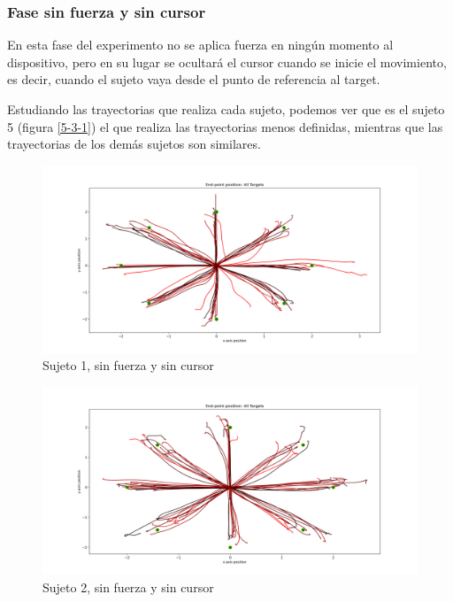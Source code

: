 \documentclass[a4paper,11pt, oneside]{book}
\begin{document}
\subsubsection{Fase sin fuerza y sin cursor}

En esta fase del experimento no se aplica fuerza en ningún momento al dispositivo, pero en su lugar se ocultará el cursor cuando se inicie el movimiento, es decir, cuando el sujeto vaya desde el punto de referencia al target.

Estudiando las trayectorias que realiza cada sujeto, podemos ver que es el sujeto 5 (figura \ref{5-3-1}) el que realiza las trayectorias menos definidas, mientras que las trayectorias de los demás sujetos son similares.

\begin{figure}[H]
	\includegraphics[width=\linewidth]{sujeto1/no_force_no_cursor/trayectorias}
	\caption{Sujeto 1, sin  fuerza y sin cursor}
	\label{1-3-1}
\end{figure}
\begin{figure}[H]
	\includegraphics[width=\linewidth]{sujeto2/no_force_no_cursor/trayectorias}
	\caption{Sujeto 2, sin  fuerza y sin cursor}
	\label{2-3-1}
\end{figure}
\end{document}
